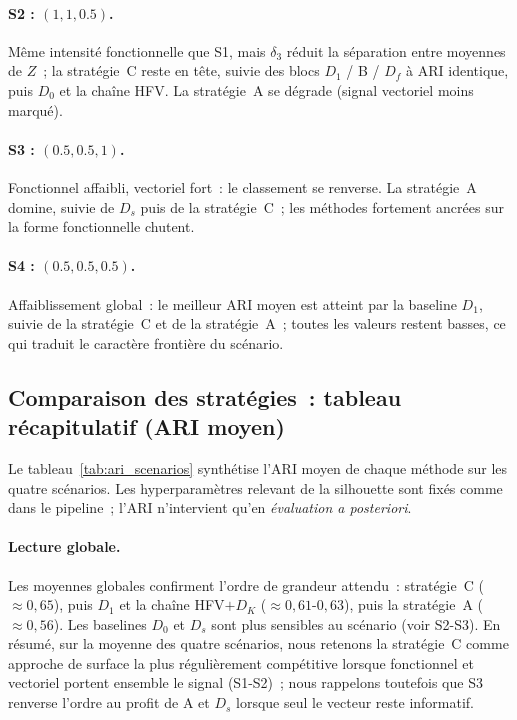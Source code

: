 \documentclass[11pt,a4paper]{article}
\newcommand{\DK}{D_K}
\begin{document}
\paragraph{S2 : $(1,1,0.5)$.} Même intensité fonctionnelle que S1, mais $\delta_3$
réduit la séparation entre moyennes de $Z$~; la stratégie~C reste en tête,
 suivie des blocs $D_1$ / B / $D_f$ à ARI identique, puis $D_0$ et la chaîne
HFV. La stratégie~A se dégrade (signal vectoriel moins marqué).

\paragraph{S3 : $(0.5,0.5,1)$.} Fonctionnel affaibli, vectoriel fort~: le classement
se renverse. La stratégie~A domine, suivie de $D_s$ puis de la stratégie~C~;
les méthodes fortement ancrées sur la forme fonctionnelle chutent.

\paragraph{S4 : $(0.5,0.5,0.5)$.} Affaiblissement global~: le meilleur ARI
moyen est atteint par la baseline $D_1$, suivie de la stratégie~C et de la
stratégie~A~; toutes les valeurs restent basses, ce qui traduit le
caractère frontière du scénario.

\subsection{Comparaison des stratégies~: tableau récapitulatif (ARI moyen)}

Le tableau~\ref{tab:ari_scenarios} synthétise l'ARI moyen de chaque méthode sur
les quatre scénarios. Les
hyperparamètres relevant de la silhouette sont fixés comme dans le pipeline~;
l'ARI n'intervient qu'en \emph{évaluation a posteriori}.



\paragraph{Lecture globale.}
Les moyennes globales confirment l'ordre de grandeur attendu~: stratégie~C
($\approx 0{,}65$), puis $D_1$ et la chaîne HFV$+\DK$ ($\approx 0{,}61$-$0{,}63$),
puis la stratégie~A ($\approx 0{,}56$). Les baselines $D_0$ et $D_s$ sont plus
sensibles au scénario (voir S2-S3). En résumé, sur la moyenne des quatre
scénarios, nous retenons la stratégie~C comme approche de surface la plus
régulièrement compétitive lorsque fonctionnel et vectoriel portent ensemble le
signal (S1-S2)~; nous rappelons toutefois que S3 renverse l'ordre au profit de
A et $D_s$ lorsque seul le vecteur reste informatif.
\end{document}
